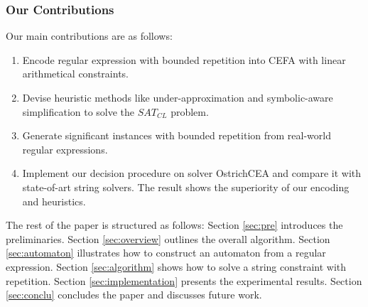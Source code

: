{\subsubsection{Our Contributions}
Our main contributions are as follows:
\begin{enumerate}
  \item  Encode regular expression with bounded repetition into CEFA with linear arithmetical constraints.
  \item  Devise heuristic methods like under-approximation and symbolic-aware simplification to solve the $SAT_{CL}$ problem.
  \item  Generate significant instances with bounded repetition from real-world regular expressions.
  \item  Implement our decision procedure on solver OstrichCEA and compare it with state-of-art string solvers. The result shows the superiority of our encoding and heuristics.
\end{enumerate}

The rest of the paper is structured as follows: Section \ref{sec:pre} introduces the preliminaries. Section \ref{sec:overview} outlines the overall algorithm. Section \ref{sec:automaton} illustrates how to construct an automaton from a regular expression. Section \ref{sec:algorithm} shows how to solve a string constraint with repetition. Section \ref{sec:implementation} presents the experimental results. Section \ref{sec:conclu} concludes the paper and discusses future work.
}


%